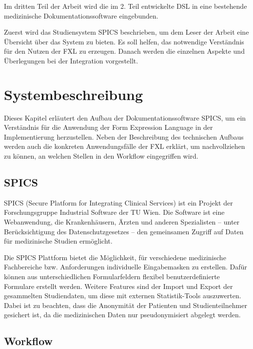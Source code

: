 Im dritten Teil der Arbeit wird die im 2. Teil entwickelte DSL in eine bestehende medizinische Dokumentationssoftware eingebunden.

Zuerst wird das Studiensystem SPICS beschrieben, um dem Leser der Arbeit eine Übersicht über das System zu bieten. Es soll helfen, das notwendige Verständnis für den Nutzen der FXL zu erzeugen. Danach werden die einzelnen Aspekte und Überlegungen bei der Integration vorgestellt.

\chapter{Systembeschreibung}
\label{chapter_systembeschreibung}

Dieses Kapitel erläutert den Aufbau der Dokumentationssoftware SPICS, um ein Verständnis für die Anwendung der Form Expression Language in der Implementierung herzustellen. Neben der Beschreibung des technischen Aufbaus werden auch die konkreten Anwendungsfälle der FXL erklärt, um nachvollziehen zu können, an welchen Stellen in den Workflow eingegriffen wird.


\section{SPICS}

SPICS (Secure Platform for Integrating Clinical Services) ist ein Projekt der  Forschungsgruppe Industrial Software der TU Wien. Die Software ist eine Webanwendung, die Krankenhäusern, Ärzten und anderen Spezialisten -- unter Berücksichtigung des Datenschutzgesetzes -- den gemeinsamen Zugriff auf Daten für medizinische Studien ermöglicht. 

Die SPICS Plattform bietet die Möglichkeit, für verschiedene medizinische Fachbereiche bzw. Anforderungen individuelle Eingabemasken zu erstellen. Dafür können aus unterschiedlichen Formularfeldern flexibel benutzerdefinierte Formulare erstellt werden. Weitere Features sind der Import und Export der gesammelten Studiendaten, um diese mit externen Statistik-Tools auszuwerten. Dabei ist zu beachten, dass die Anonymität der Patienten und Studienteilnehmer gesichert ist, da die medizinischen Daten nur pseudonymisiert abgelegt werden.


\section{Workflow}
\label{section_systembeschreibung_workflow}

